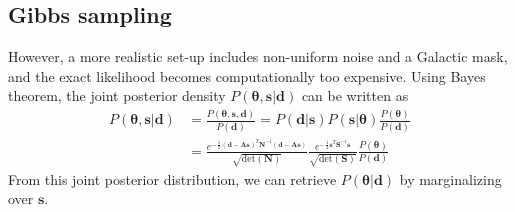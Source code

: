 \documentclass[twocolumn]{../common/aa}
\begin{document}
\subsection{Gibbs sampling}
\label{sec:gibbs}

However, a more realistic set-up includes non-uniform noise and a Galactic mask, and the exact likelihood becomes computationally too expensive. Using Bayes theorem, the joint posterior density $P(\boldsymbol{\theta}, \boldsymbol{s} | \boldsymbol{d})$ can be written as
\begin{align}
    \nonumber
    P(\boldsymbol{\theta}, \boldsymbol{s} | \boldsymbol{d}) &= \frac{P(\boldsymbol{\theta}, \boldsymbol{s}, \boldsymbol{d})}{P(\boldsymbol{d})} = P(\boldsymbol{d} | \boldsymbol{s})P(\boldsymbol{s}| \boldsymbol{\theta})\frac{P(\boldsymbol{\theta})}{P(\boldsymbol{d})}\\
    \label{eq:joint-posterior}
    &= \frac{e^{-\frac12 \left(\boldsymbol{d}-\boldsymbol{A}\boldsymbol{s} \right)^T \boldsymbol{N}^{-1}\left(\boldsymbol{d}-\boldsymbol{A}\boldsymbol{s} \right)}}{\sqrt{\mathrm{det}\left(\boldsymbol{N}\right)}}
    \frac{e^{-\frac12 \boldsymbol{s}^T \boldsymbol{S}^{-1}\boldsymbol{s}}}{\sqrt{\mathrm{det}\left(\boldsymbol{S}\right)}}\frac{P(\boldsymbol{\theta})}{P(\boldsymbol{d})}
\end{align}
From this joint posterior distribution, we can retrieve $P(\boldsymbol{\theta} | \boldsymbol{d})$ by marginalizing over $\boldsymbol{s}$.
\end{document}
